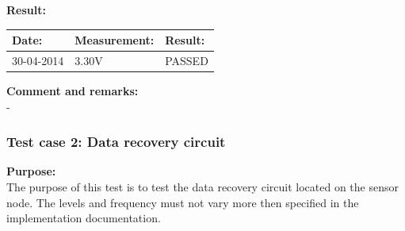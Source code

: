 \textbf{Result:}
\begin{table}[H]
\centering
\begin{tabular}{|p{2cm}|p{3cm}|p{2cm}|}\hline
\textbf{Date:} & \textbf{Measurement:} & \textbf{Result:} \\ \hline
30-04-2014 & 3.30V & PASSED \\ \hline
\end{tabular}
\end{table}

\textbf{Comment and remarks:}\\
-\\

\subsubsection{Test case 2: Data recovery circuit}
\textbf{Purpose:}\\
The purpose of this test is to test the data recovery circuit located on the sensor node.  The levels and frequency must not vary more then specified in the implementation documentation.\\


